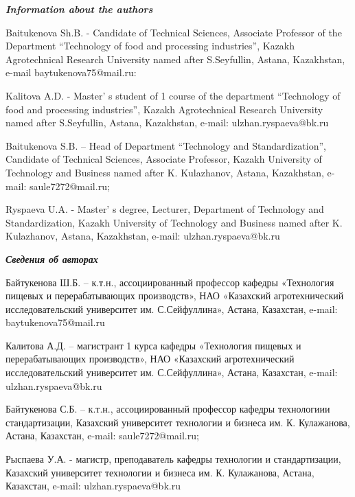 \begin{authorinfo}
\emph{{\bfseries Information about the authors}}

Baitukenova Sh.B. - Candidate of Technical Sciences, Associate Professor
of the Department ``Technology of food and processing industries'',
Kazakh Agrotechnical Research University named after S.Seyfullin,
Astana, Kazakhstan, e-mail baytukenova75@mail.ru:

Kalitova A.D. - Master' s student of 1 course of the
department ``Technology of food and processing industries'', Kazakh
Agrotechnical Research University named after S.Seyfullin, Astana,
Kazakhstan, e-mail: ulzhan.ryspaeva@bk.ru

Baitukenova S.B. -- Head of Department ``Technology and
Standardization'', Candidate of Technical Sciences, Associate Professor,
Kazakh University of Technology and Business named after K. Kulazhanov,
Astana, Kazakhstan, e-mail: saule7272@mail.ru;

Ryspaeva U.A. - Master' s degree, Lecturer, Department of
Technology and Standardization, Kazakh University of Technology and
Business named after K. Kulazhanov, Astana, Kazakhstan, e-mail:
ulzhan.ryspaeva@bk.ru

\emph{{\bfseries Сведения об авторах}}

Байтукенова Ш.Б. -- к.т.н., ассоциированный профессор кафедры
«Технология пищевых и перерабатывающих производств», НАО «Казахский
агротехнический исследовательский университет им. С.Сейфуллина», Астана,
Казахстан, e-mail: baytukenova75@mail.ru

Калитова А.Д. -- магистрант 1 курса кафедры «Технология пищевых и
перерабатывающих производств», НАО «Казахский агротехнический
исследовательский университет им. С.Сейфуллина», Астана, Казахстан,
e-mail: ulzhan.ryspaeva@bk.ru

Байтукенова С.Б. -- к.т.н., ассоциированный профессор кафедры
технологиии стандартизации, Казахский университет технологии и бизнеса
им. К. Кулажанова, Астана, Казахстан, e-mail: saule7272@mail.ru;

Рыспаева У.А. - магистр, преподаватель кафедры технологии и
стандартизации, Казахский университет технологии и бизнеса им. К.
Кулажанова, Астана, Казахстан, e-mail: ulzhan.ryspaeva@bk.ru
\end{authorinfo}
